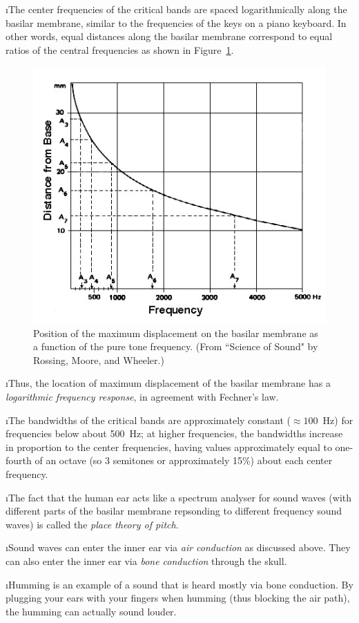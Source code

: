 \i The center frequencies of the critical bands are spaced 
logarithmically along the basilar membrane, similar to 
the frequencies of the keys on a piano keyboard.
In other words, equal distances along the basilar membrane 
correspond to equal ratios of the central frequencies as shown
in Figure~\ref{f:basilar-resonance-max}.
%
\begin{figure}[htbp]
\begin{center}
\includegraphics[width=.6\textwidth]{basilar-resonance-max.jpg}
\caption{Position of the maximum displacement on 
the basilar membrane as a function of the pure tone 
frequency.
(From ``Science of Sound" by Rossing, Moore, and Wheeler.)}
\label{f:basilar-resonance-max}
\end{center}
\end{figure}
%

\i Thus, the location of maximum displacement of the 
basilar membrane has a {\em logarithmic frequency response},
in agreement with Fechner's law.

\i The bandwidths of the critical bands are approximately
constant ($\approx 100$~Hz) for frequencies below about 500~Hz;
at higher frequencies, the bandwidths increase in proportion 
to the center frequencies, having values approximately equal
to one-fourth of an octave (so 3 semitones or approximately
15\%) about each center frequency.

\i The fact that the human ear acts like a spectrum analyser 
for sound waves (with different parts of the basilar membrane
repsonding to different frequency sound waves) 
is called the {\em place theory of pitch}.

\i Sound waves can enter the inner ear via {\em air conduction} 
as discussed above.
They can also enter the inner ear via {\em bone conduction} through 
the skull.

\i Humming is an example of a sound that is heard mostly 
via bone conduction.
By plugging your ears with your fingers when humming 
(thus blocking the air path), the humming can actually sound louder.

